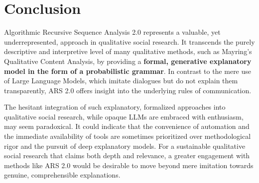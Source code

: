 \documentclass{article}
\begin{document}
\section{Conclusion}
Algorithmic Recursive Sequence Analysis 2.0 represents a valuable, yet underrepresented, approach in qualitative social research. It transcends the purely descriptive and interpretive level of many qualitative methods, such as Mayring's Qualitative Content Analysis, by providing a \textbf{formal, generative explanatory model in the form of a probabilistic grammar}. In contrast to the mere use of Large Language Models, which imitate dialogues but do not explain them transparently, ARS 2.0 offers insight into the underlying rules of communication.

The hesitant integration of such explanatory, formalized approaches into qualitative social research, while opaque LLMs are embraced with enthusiasm, may seem paradoxical. It could indicate that the convenience of automation and the immediate availability of tools are sometimes prioritized over methodological rigor and the pursuit of deep explanatory models. For a sustainable qualitative social research that claims both depth and relevance, a greater engagement with methods like ARS 2.0 would be desirable to move beyond mere imitation towards genuine, comprehensible explanations.
\end{document}
